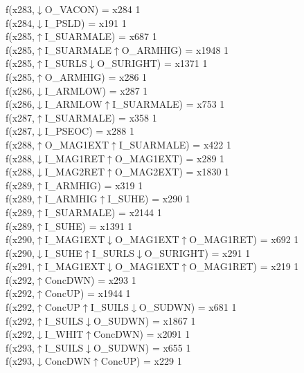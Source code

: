 f(x283,$\downarrow$O\_VACON) = x284 {1} \\
f(x284,$\downarrow$I\_PSLD) = x191 {1} \\
f(x285,$\uparrow$I\_SUARMALE) = x687 {1} \\
f(x285,$\uparrow$I\_SUARMALE$\uparrow$O\_ARMHIG) = x1948 {1} \\
f(x285,$\uparrow$I\_SURLS$\downarrow$O\_SURIGHT) = x1371 {1} \\
f(x285,$\uparrow$O\_ARMHIG) = x286 {1} \\
f(x286,$\downarrow$I\_ARMLOW) = x287 {1} \\
f(x286,$\downarrow$I\_ARMLOW$\uparrow$I\_SUARMALE) = x753 {1} \\
f(x287,$\uparrow$I\_SUARMALE) = x358 {1} \\
f(x287,$\downarrow$I\_PSEOC) = x288 {1} \\
f(x288,$\uparrow$O\_MAG1EXT$\uparrow$I\_SUARMALE) = x422 {1} \\
f(x288,$\downarrow$I\_MAG1RET$\uparrow$O\_MAG1EXT) = x289 {1} \\
f(x288,$\downarrow$I\_MAG2RET$\uparrow$O\_MAG2EXT) = x1830 {1} \\
f(x289,$\uparrow$I\_ARMHIG) = x319 {1} \\
f(x289,$\uparrow$I\_ARMHIG$\uparrow$I\_SUHE) = x290 {1} \\
f(x289,$\uparrow$I\_SUARMALE) = x2144 {1} \\
f(x289,$\uparrow$I\_SUHE) = x1391 {1} \\
f(x290,$\uparrow$I\_MAG1EXT$\downarrow$O\_MAG1EXT$\uparrow$O\_MAG1RET) = x692 {1} \\
f(x290,$\downarrow$I\_SUHE$\uparrow$I\_SURLS$\downarrow$O\_SURIGHT) = x291 {1} \\
f(x291,$\uparrow$I\_MAG1EXT$\downarrow$O\_MAG1EXT$\uparrow$O\_MAG1RET) = x219 {1} \\
f(x292,$\uparrow$ConcDWN) = x293 {1} \\
f(x292,$\uparrow$ConcUP) = x1944 {1} \\
f(x292,$\uparrow$ConcUP$\uparrow$I\_SUILS$\downarrow$O\_SUDWN) = x681 {1} \\
f(x292,$\uparrow$I\_SUILS$\downarrow$O\_SUDWN) = x1867 {1} \\
f(x292,$\downarrow$I\_WHIT$\uparrow$ConcDWN) = x2091 {1} \\
f(x293,$\uparrow$I\_SUILS$\downarrow$O\_SUDWN) = x655 {1} \\
f(x293,$\downarrow$ConcDWN$\uparrow$ConcUP) = x229 {1} \\
